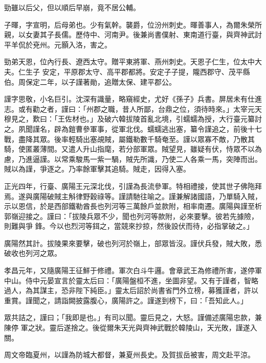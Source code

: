 \begin{pinyinscope}
 勁雖以后父，但以順后早崩，竟不居公輔。



 子暉，字宣明，后母弟也。少有氣幹。襲爵，位汾州刺史。暉善事人，為爾朱榮所親，以女妻其子長儒。歷侍中、河南尹。後兼尚書僕射、東南道行臺，與齊神武討平羊侃於兗州。元顥入洛，害之。



 勁弟天恩，位內行長、遼西太守。贈平東將軍、燕州刺史。天恩子仁生，位太中大夫。仁生子
 安定，平原郡太守、高平郡都將。安定子子提，隴西郡守、茂平縣伯。周保定二年，以子謹著勛，追贈太保、建平郡公。



 謹字思敬，小名巨引。沈深有識量，略窺經史，尤好《孫子》兵書。屏居未有仕進志。或有勸之者，謹曰：「州郡之職，昔人所鄙，台鼎之位，須待時來。」太宰元天穆見之，歎曰：「王佐材也。」及破六韓拔陵首亂北境，引蠕蠕為授，大行臺元纂討之。夙聞謹名，辟為鎧曹參軍事，從軍北伐。蠕蠕逃出塞，纂令謹追之，前後十七戰，盡降其眾。後率輕騎出塞覘賊，屬鐵勒數千騎奄至。謹以眾寡不敵，乃散其
 騎，使匿叢薄間。又遣人升山指麾，若分部軍眾。賊望見，雖疑有伏，恃眾不以為慮，乃進逼謹。以常乘駿馬一紫一騧，賊先所識，乃使二人各乘一馬，突陣而出。賊以為謹，爭逐之。乃率餘軍擊其追騎。賊走，因得入塞。



 正光四年，行臺、廣陽王元深北伐，引謹為長流參軍。特相禮接，使其世子佛陁拜焉。遂與廣陽破賊主斛律野穀祿等。謹請馳往喻之。謹兼解諸國語，乃單騎入賊，示以恩信，於是西部鐵勒酋長也列河等三萬餘戶並款附，相率南遷。廣陽與謹至析郭嶺迎接之。謹曰：「拔陵兵眾不少，聞也列河等款附，必來要擊。彼若先據險，則難與爭
 鋒。今以也烈河等鉺之，當競來抄掠，然後設伏而待，必指掌破之。」



 廣陽然其計。拔陵果來要擊，破也列河於嶺上，部眾皆沒。謹伏兵發，賊大敗，悉破收也列河之眾。



 孝昌元年，又隨廣陽王征鮮于修禮。軍次白斗牛邏。會章武王為修禮所害，遂停軍中山。侍中元晏宣言於靈太后曰：「廣陽盤桓不進，坐圖非望。又有于謹者，智略過人，為其謀主，恐非陛下純臣。」靈太后詔於尚書省門外立榜，募獲謹者，許以重賞。謹聞之，請詣闕披露腹心，廣陽許之。謹遂到榜下，曰：「吾知此人。」



 眾共詰之，謹曰；「我即是也。」有司以聞。靈后見之，大怒。謹備述廣陽忠款，兼陳停
 軍之狀。靈后遂捨之。後從爾朱天光與齊神武戰於韓陵山，天光敗，謹遂入關。



 周文帝臨夏州，以謹為防城大都督，兼夏州長史。及賀拔岳被害，周文赴平涼。




\end{pinyinscope}
